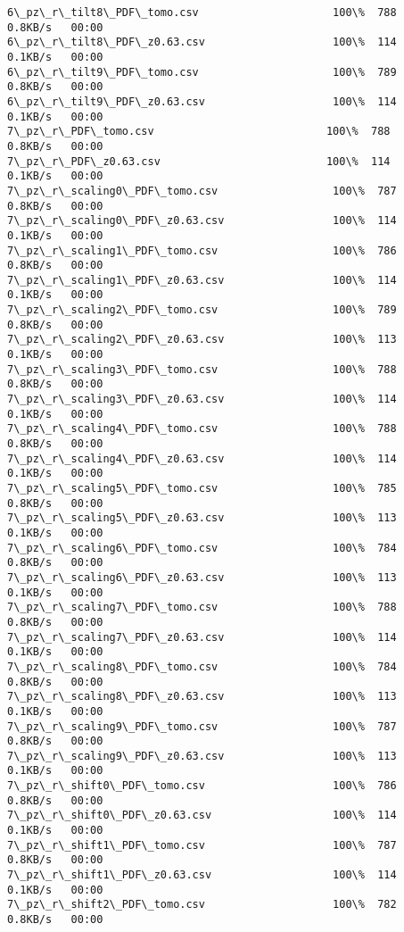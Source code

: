 \documentclass[11pt]{article}
\begin{document}
\begin{Verbatim}[commandchars=\\\{\}]
6\_pz\_r\_tilt8\_PDF\_tomo.csv                     100\%  788     0.8KB/s   00:00    
6\_pz\_r\_tilt8\_PDF\_z0.63.csv                    100\%  114     0.1KB/s   00:00    
6\_pz\_r\_tilt9\_PDF\_tomo.csv                     100\%  789     0.8KB/s   00:00    
6\_pz\_r\_tilt9\_PDF\_z0.63.csv                    100\%  114     0.1KB/s   00:00    
7\_pz\_r\_PDF\_tomo.csv                           100\%  788     0.8KB/s   00:00    
7\_pz\_r\_PDF\_z0.63.csv                          100\%  114     0.1KB/s   00:00    
7\_pz\_r\_scaling0\_PDF\_tomo.csv                  100\%  787     0.8KB/s   00:00    
7\_pz\_r\_scaling0\_PDF\_z0.63.csv                 100\%  114     0.1KB/s   00:00    
7\_pz\_r\_scaling1\_PDF\_tomo.csv                  100\%  786     0.8KB/s   00:00    
7\_pz\_r\_scaling1\_PDF\_z0.63.csv                 100\%  114     0.1KB/s   00:00    
7\_pz\_r\_scaling2\_PDF\_tomo.csv                  100\%  789     0.8KB/s   00:00    
7\_pz\_r\_scaling2\_PDF\_z0.63.csv                 100\%  113     0.1KB/s   00:00    
7\_pz\_r\_scaling3\_PDF\_tomo.csv                  100\%  788     0.8KB/s   00:00    
7\_pz\_r\_scaling3\_PDF\_z0.63.csv                 100\%  114     0.1KB/s   00:00    
7\_pz\_r\_scaling4\_PDF\_tomo.csv                  100\%  788     0.8KB/s   00:00    
7\_pz\_r\_scaling4\_PDF\_z0.63.csv                 100\%  114     0.1KB/s   00:00    
7\_pz\_r\_scaling5\_PDF\_tomo.csv                  100\%  785     0.8KB/s   00:00    
7\_pz\_r\_scaling5\_PDF\_z0.63.csv                 100\%  113     0.1KB/s   00:00    
7\_pz\_r\_scaling6\_PDF\_tomo.csv                  100\%  784     0.8KB/s   00:00    
7\_pz\_r\_scaling6\_PDF\_z0.63.csv                 100\%  113     0.1KB/s   00:00    
7\_pz\_r\_scaling7\_PDF\_tomo.csv                  100\%  788     0.8KB/s   00:00    
7\_pz\_r\_scaling7\_PDF\_z0.63.csv                 100\%  114     0.1KB/s   00:00    
7\_pz\_r\_scaling8\_PDF\_tomo.csv                  100\%  784     0.8KB/s   00:00    
7\_pz\_r\_scaling8\_PDF\_z0.63.csv                 100\%  113     0.1KB/s   00:00    
7\_pz\_r\_scaling9\_PDF\_tomo.csv                  100\%  787     0.8KB/s   00:00    
7\_pz\_r\_scaling9\_PDF\_z0.63.csv                 100\%  113     0.1KB/s   00:00    
7\_pz\_r\_shift0\_PDF\_tomo.csv                    100\%  786     0.8KB/s   00:00    
7\_pz\_r\_shift0\_PDF\_z0.63.csv                   100\%  114     0.1KB/s   00:00    
7\_pz\_r\_shift1\_PDF\_tomo.csv                    100\%  787     0.8KB/s   00:00    
7\_pz\_r\_shift1\_PDF\_z0.63.csv                   100\%  114     0.1KB/s   00:00    
7\_pz\_r\_shift2\_PDF\_tomo.csv                    100\%  782     0.8KB/s   00:00    

\end{Verbatim}
\end{document}
